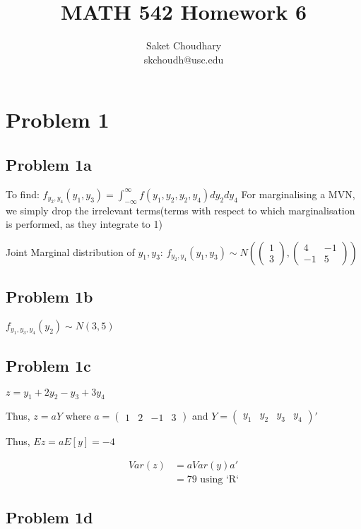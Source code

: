 \documentclass[a4paper]{article}
\title{MATH 542 Homework 6}
\author{Saket Choudhary\\skchoudh@usc.edu}
\begin{document}
\maketitle 
\section*{Problem 1}
\subsection*{Problem 1a}

To find: $f_{y_2,y_4}(y_1,y_3) = \int_{-\infty}^{\infty}f(y_1,y_2,y_2,y_4)dy_2dy_4$
For marginalising a MVN, we simply drop the irrelevant terms(terms with respect to which marginalisation is performed, as they integrate to 1)

Joint Marginal distribution of $y_1,y_3$: $f_{y_2,y_4}(y_1,y_3) \sim N(\begin{pmatrix}1 \\ 3\end{pmatrix},\begin{pmatrix}4 & -1 \\ -1 &5\end{pmatrix})$

\subsection*{Problem 1b}
$f_{y_1,y_3,y_4}(y_2) \sim N(3, 5)$

\subsection*{Problem 1c}
$z=y_1+2y_2-y_3+3y_4$ 

Thus, $z=aY$ where $a = \begin{pmatrix}1 & 2 & -1 & 3 \end{pmatrix}$ and $Y=\begin{pmatrix}y_1 & y_2 & y_3 & y_4\end{pmatrix}'$

Thus, $Ez = aE[y] = -4$

\begin{align*}
Var(z) &= aVar(y)a'\\
& = 79 \text{ using `R`}
\end{align*}

\subsection*{Problem 1d}
\end{document}
